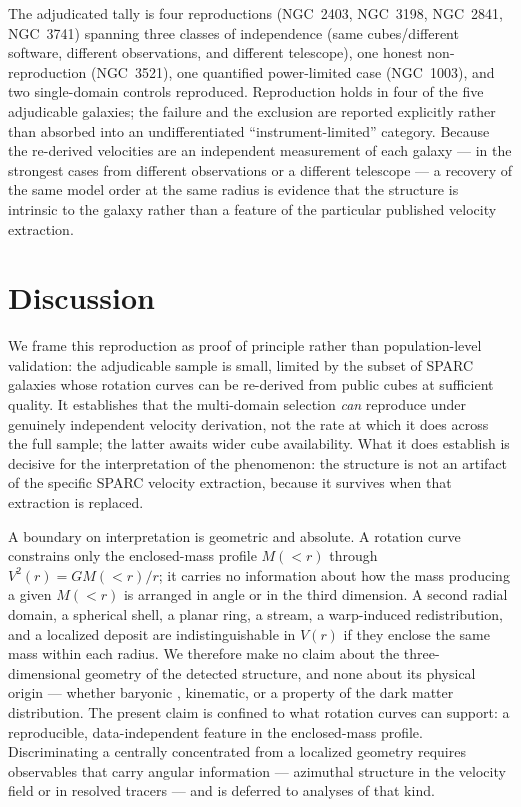 \documentclass[twocolumn]{aastex701}
\begin{document}
The adjudicated tally is four reproductions (NGC~2403, NGC~3198, NGC~2841,
NGC~3741) spanning three classes of independence (same cubes/different software,
different observations, and different telescope), one honest non-reproduction
(NGC~3521), one quantified power-limited case (NGC~1003), and two single-domain
controls reproduced. Reproduction holds in four of the five adjudicable galaxies;
the failure and the exclusion are reported explicitly rather than absorbed into an
undifferentiated ``instrument-limited'' category. Because the re-derived
velocities are an independent measurement of each galaxy --- in the strongest
cases from different observations or a different telescope --- a recovery of the
same model order at the same radius is evidence that the structure is intrinsic to the
galaxy rather than a feature of the particular published velocity extraction.

\section{Discussion} \label{sec:discussion}

We frame this reproduction as proof of principle rather than population-level
validation: the adjudicable sample is small, limited by the subset of SPARC
galaxies whose rotation curves can be re-derived from public cubes at sufficient
quality. It establishes that the multi-domain selection \emph{can} reproduce under
genuinely independent velocity derivation, not the rate at which it does across
the full sample; the latter awaits wider cube availability. What it does establish
is decisive for the interpretation of the phenomenon: the structure is not an
artifact of the specific SPARC velocity extraction, because it survives when that
extraction is replaced.

A boundary on interpretation is geometric and absolute. A rotation curve
constrains only the enclosed-mass profile $M({<}r)$ through $V^2(r) = G
M({<}r)/r$; it carries no information about how the mass producing a given
$M({<}r)$ is arranged in angle or in the third dimension. A second radial domain,
a spherical shell, a planar ring, a stream, a warp-induced redistribution, and a
localized deposit are indistinguishable in $V(r)$ if they enclose the same mass
within each radius. We therefore make no claim about the three-dimensional
geometry of the detected structure, and none about its physical origin --- whether
baryonic \citep[e.g.\ features propagated from the gas disk;][]{Sancisi2004},
kinematic, or a property of the dark matter distribution. The present claim is
confined to what rotation curves can support: a reproducible, data-independent
feature in the enclosed-mass profile. Discriminating a centrally concentrated from
a localized geometry requires observables that carry angular information ---
azimuthal structure in the velocity field or in resolved tracers --- and is
deferred to analyses of that kind.
\end{document}
